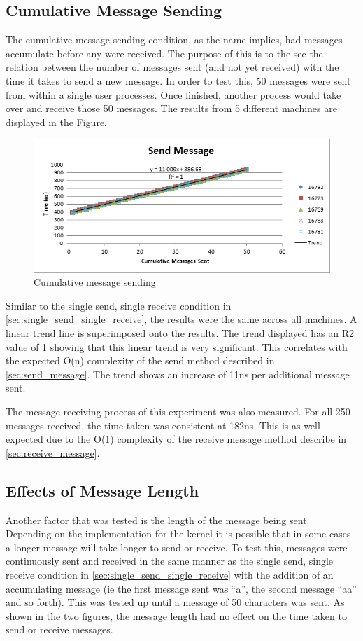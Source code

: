\documentclass[12pt]{report}
\begin{document}
\subsection{Cumulative Message Sending}
\label{sec:cumulative_message_sending}

The cumulative message sending condition, as the name implies, had messages accumulate before any were received. The purpose of this is to the see the relation between the number of messages sent (and not yet received) with the time it takes to send a new message. In order to test this, 50 messages were sent from within a single user processes. Once finished, another process would take over and receive those 50 messages. The results from 5 different machines are displayed in the Figure.
\begin{figure}[h!]
  \centering
    \includegraphics{SendMessage.png}
  \caption{Cumulative message sending}
\end{figure}

Similar to the single send, single receive condition in \ref{sec:single_send_single_receive}, the results were the same across all machines. A linear trend line is superimposed onto the results. The trend displayed has an R2 value of 1 showing that this linear trend is very significant. This correlates with the expected O(n) complexity of the send method described in \ref{sec:send_message}. The trend shows an increase of 11ns per additional message sent.

The message receiving process of this experiment was also measured. For all 250 messages received, the time taken was consistent at 182ns. This is as well expected due to the O(1) complexity of the receive message method describe in \ref{sec:receive_message}.

\subsection{Effects of Message Length}
\label{sec:message_length}
Another factor that was tested is the length of the message being sent. Depending on the implementation for the kernel it is possible that in some cases a longer message will take longer to send or receive. To test this, messages were continuously sent and received in the same manner as the single send, single receive condition in \ref{sec:single_send_single_receive} with the addition of an accumulating message (ie the first message sent was “a”, the second message “aa” and so forth).  This was tested up until a message of 50 characters was sent. As shown in the two figures, the message length had no effect on the time taken to send or receive messages.
\end{document}

